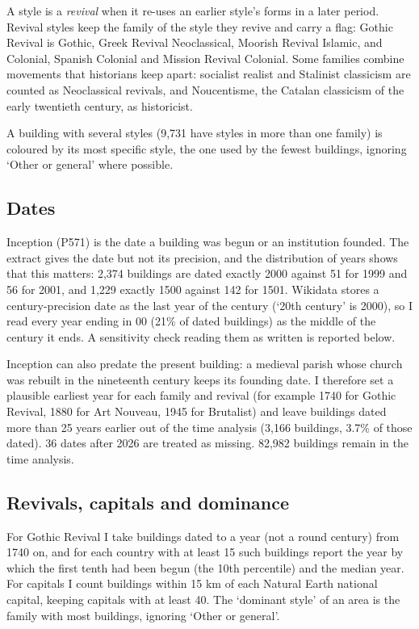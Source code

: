 \documentclass[11pt,a4paper]{article}
\begin{document}
A style is a \emph{revival} when it re-uses an earlier style's forms in a later period. Revival styles keep the family of the style they revive and carry a flag: Gothic Revival is Gothic, Greek Revival Neoclassical, Moorish Revival Islamic, and Colonial, Spanish Colonial and Mission Revival Colonial. Some families combine movements that historians keep apart: socialist realist and Stalinist classicism are counted as Neoclassical revivals, and Noucentisme, the Catalan classicism of the early twentieth century, as historicist.

A building with several styles (9,731 have styles in more than one family) is coloured by its most specific style, the one used by the fewest buildings, ignoring `Other or general' where possible.

\subsection{Dates}
Inception (P571) is the date a building was begun or an institution founded. The extract gives the date but not its precision, and the distribution of years shows that this matters: 2,374 buildings are dated exactly 2000 against 51 for 1999 and 56 for 2001, and 1,229 exactly 1500 against 142 for 1501. Wikidata stores a century-precision date as the last year of the century (`20th century' is 2000), so I read every year ending in 00 (21\% of dated buildings) as the middle of the century it ends. A sensitivity check reading them as written is reported below.

Inception can also predate the present building: a medieval parish whose church was rebuilt in the nineteenth century keeps its founding date. I therefore set a plausible earliest year for each family and revival (for example 1740 for Gothic Revival, 1880 for Art Nouveau, 1945 for Brutalist) and leave buildings dated more than 25 years earlier out of the time analysis (3,166 buildings, 3.7\% of those dated). 36 dates after 2026 are treated as missing. 82,982 buildings remain in the time analysis.

\subsection{Revivals, capitals and dominance}
For Gothic Revival I take buildings dated to a year (not a round century) from 1740 on, and for each country with at least 15 such buildings report the year by which the first tenth had been begun (the 10th percentile) and the median year. For capitals I count buildings within 15 km of each Natural Earth national capital, keeping capitals with at least 40. The `dominant style' of an area is the family with most buildings, ignoring `Other or general'.
\end{document}
